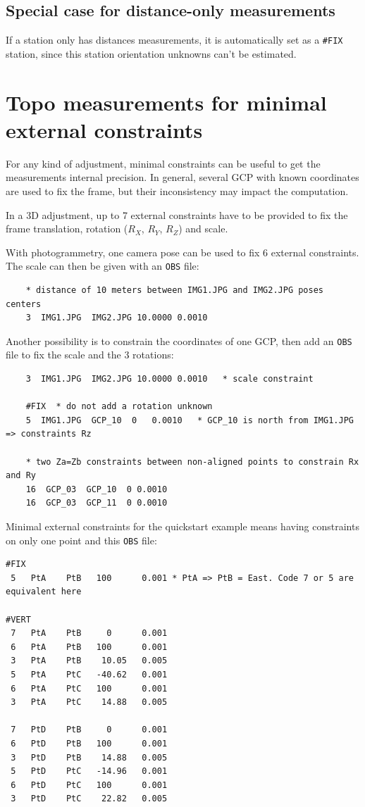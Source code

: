 \subsection{Special case for distance-only measurements}

If a station only has distances measurements, it is automatically
set as a \texttt{\#FIX} station, since this station orientation unknowns
can't be estimated.


\section{Topo measurements for minimal external constraints}

For any kind of adjustment, minimal constraints can be useful to get the measurements internal precision.
In general, several GCP with known coordinates are used to fix the frame, but their inconsistency may
impact the computation.

In a 3D adjustment, up to 7 external constraints have to be provided to fix the frame translation, rotation ($R_X$, $R_Y$, $R_Z$) and scale.

With photogrammetry, one camera pose can be used to fix 6 external constraints. The scale can then be given with an \texttt{OBS} file:
\begin{verbatim}
    * distance of 10 meters between IMG1.JPG and IMG2.JPG poses centers
    3  IMG1.JPG  IMG2.JPG 10.0000 0.0010   
\end{verbatim}

Another possibility is to constrain the coordinates of one GCP, then add an \texttt{OBS} file to fix the scale and the 3 rotations:
\begin{verbatim}
    3  IMG1.JPG  IMG2.JPG 10.0000 0.0010   * scale constraint

    #FIX  * do not add a rotation unknown
    5  IMG1.JPG  GCP_10  0   0.0010   * GCP_10 is north from IMG1.JPG => constraints Rz

    * two Za=Zb constraints between non-aligned points to constrain Rx and Ry
    16  GCP_03  GCP_10  0 0.0010
    16  GCP_03  GCP_11  0 0.0010
\end{verbatim}

Minimal external constraints for the quickstart example means having constraints on only one point and this \texttt{OBS} file:

\begin{verbatim}
#FIX
 5   PtA    PtB   100      0.001 * PtA => PtB = East. Code 7 or 5 are equivalent here
 
#VERT
 7   PtA    PtB     0      0.001
 6   PtA    PtB   100      0.001
 3   PtA    PtB    10.05   0.005
 5   PtA    PtC   -40.62   0.001
 6   PtA    PtC   100      0.001
 3   PtA    PtC    14.88   0.005

 7   PtD    PtB     0      0.001
 6   PtD    PtB   100      0.001
 3   PtD    PtB    14.88   0.005
 5   PtD    PtC   -14.96   0.001
 6   PtD    PtC   100      0.001
 3   PtD    PtC    22.82   0.005
\end{verbatim}



